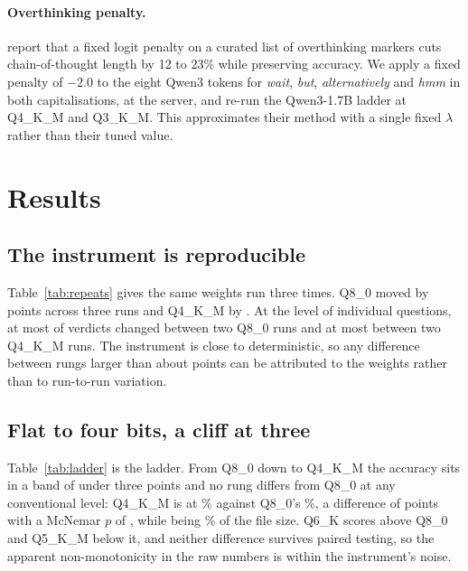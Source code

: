 \documentclass[10pt]{article}
\newcommand{\qm}{Qwen3-1.7B}
\begin{document}
\paragraph{Overthinking penalty.} \citet{lotfi2026overthink} report that a fixed logit penalty on a curated list of overthinking markers cuts chain-of-thought length by 12 to 23\% while preserving accuracy. We apply a fixed penalty of $-2.0$ to the eight Qwen3 tokens for \emph{wait}, \emph{but}, \emph{alternatively} and \emph{hmm} in both capitalisations, at the server, and re-run the \qm{} ladder at Q4\_K\_M and Q3\_K\_M. This approximates their method with a single fixed $\lambda$ rather than their tuned value.

\section{Results}

\subsection{The instrument is reproducible}
\label{sec:repro}

Table~\ref{tab:repeats} gives the same weights run three times. Q8\_0 moved by \qtRepRangeEight{} points across three runs and Q4\_K\_M by \qtRepRangeFour{}. At the level of individual questions, at most \qtRepFlipsMaxEight{} of \qtN{} verdicts changed between two Q8\_0 runs and at most \qtRepFlipsMaxFour{} between two Q4\_K\_M runs. The instrument is close to deterministic, so any difference between rungs larger than about \qtMaxRepRange{} points can be attributed to the weights rather than to run-to-run variation.

\begin{table}[t]
\centering\small

\caption{Run-to-run variation with identical weights and settings, \texttt{simple\_python}, $n=\qtN{}$.}
\label{tab:repeats}
\end{table}

\subsection{Flat to four bits, a cliff at three}
\label{sec:ladder}

Table~\ref{tab:ladder} is the ladder. From Q8\_0 down to Q4\_K\_M the accuracy sits in a band of under three points and no rung differs from Q8\_0 at any conventional level: Q4\_K\_M is at \qtAccFour{}\% against Q8\_0's \qtAccEight{}\%, a difference of \qtDeltaFour{} points with a McNemar $p$ of \qtPFour{}, while being \qtSizeRatioFour{}\% of the file size. Q6\_K scores above Q8\_0 and Q5\_K\_M below it, and neither difference survives paired testing, so the apparent non-monotonicity in the raw numbers is within the instrument's noise.
\end{document}
